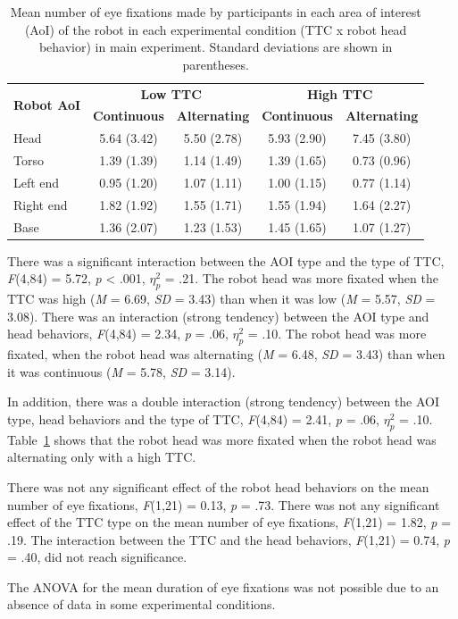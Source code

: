 \documentclass[a4paper,11pt,twoside]{StyleThese}
\begin{document}
\begin{itemize}
\begin{table}[!htbp]
   \caption{\label{table:eye_fixation_ttc_head} Mean number of eye fixations made by participants in each area of interest (AoI) of the robot in each experimental condition (TTC x robot head behavior) in main experiment. Standard deviations are shown in parentheses.}
    \begin{tabular}{lcccc}
    \hline
    \multirow{2}{*}{\textbf{Robot AoI}} & \multicolumn{2}{c}{\textbf{Low TTC}} & \multicolumn{2}{c}{\textbf{High TTC}} \\
    \cline{2-5} 
               & \textbf{Continuous}  & \textbf{Alternating}  & \textbf{Continuous}  & \textbf{Alternating}   \\
    \hline
    Head       & 5.64 (3.42)  & 5.50 (2.78)  & 5.93 (2.90)  & 7.45 (3.80)   \\
    Torso      & 1.39 (1.39)  & 1.14 (1.49)  & 1.39 (1.65)  & 0.73 (0.96)   \\
    Left end   & 0.95 (1.20)  & 1.07 (1.11)  & 1.00 (1.15)  & 0.77 (1.14)   \\
    Right end  & 1.82 (1.92)  & 1.55 (1.71)  & 1.55 (1.94)  & 1.64 (2.27)   \\
    Base       & 1.36 (2.07)  & 1.23 (1.53)  & 1.45 (1.65)  & 1.07 (1.27)   \\
    \hline
\end{tabular}
\end{table}

There was a significant interaction between the AOI type and the type of TTC, \textit{F}(4,84) = 5.72, \textit{p} < .001, $\eta_{p}^{2}$ = .21. The robot head was more fixated when the TTC was high (\textit{M} = 6.69, \textit{SD} = 3.43) than when it was low (\textit{M} = 5.57, \textit{SD} = 3.08). There was an interaction (strong tendency) between the AOI type and head behaviors, \textit{F}(4,84) = 2.34, \textit{p} = .06, $\eta_{p}^{2}$ = .10. The robot head was more fixated, when the robot head was alternating  (\textit{M} = 6.48, \textit{SD} = 3.43) than when it was continuous (\textit{M} = 5.78, \textit{SD} = 3.14).

In addition, there was a double interaction (strong tendency) between the AOI type, head behaviors and the type of TTC, \textit{F}(4,84) = 2.41, \textit{p} = .06, $\eta_{p}^{2}$ = .10. Table~\ref{table:eye_fixation_ttc_head} shows that the robot head was more fixated when the robot head was alternating only with a high TTC.

There was not any significant effect of the robot head behaviors on the mean number of eye fixations, \textit{F}(1,21) = 0.13, \textit{p} = .73. There was not any significant effect of the TTC type on the mean number of eye fixations, \textit{F}(1,21) = 1.82, \textit{p} = .19. The interaction between the TTC and the head behaviors, \textit{F}(1,21) = 0.74, \textit{p} = .40, did not reach significance.

The ANOVA for the mean duration of eye fixations was not possible due to an absence of data in some experimental conditions.
\end{itemize}
\end{document}
